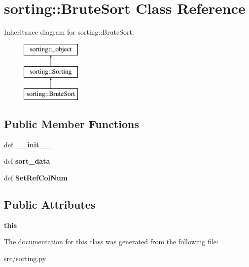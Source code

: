 \hypertarget{classsorting_1_1BruteSort}{
\section{sorting::BruteSort Class Reference}
\label{d3/dc2/classsorting_1_1BruteSort}
}
Inheritance diagram for sorting::BruteSort:\begin{figure}[H]
\begin{center}
\leavevmode
\includegraphics[height=3cm]{d3/dc2/classsorting_1_1BruteSort}
\end{center}
\end{figure}
\subsection*{Public Member Functions}
\begin{DoxyCompactItemize}
\item 
\hypertarget{classsorting_1_1BruteSort_ab23764289597790c5cdef1524bba8beb}{
def {\bfseries \_\-\_\-init\_\-\_\-}}
\label{d3/dc2/classsorting_1_1BruteSort_ab23764289597790c5cdef1524bba8beb}

\item 
\hypertarget{classsorting_1_1BruteSort_a02742dba963ab95c7f1f0106107b7234}{
def {\bfseries sort\_\-data}}
\label{d3/dc2/classsorting_1_1BruteSort_a02742dba963ab95c7f1f0106107b7234}

\item 
\hypertarget{classsorting_1_1BruteSort_a601fe10f0942c6fd6707eda68b7ec40a}{
def {\bfseries SetRefColNum}}
\label{d3/dc2/classsorting_1_1BruteSort_a601fe10f0942c6fd6707eda68b7ec40a}

\end{DoxyCompactItemize}
\subsection*{Public Attributes}
\begin{DoxyCompactItemize}
\item 
\hypertarget{classsorting_1_1BruteSort_abaf959081e7032ed48fe657be3d1c034}{
{\bfseries this}}
\label{d3/dc2/classsorting_1_1BruteSort_abaf959081e7032ed48fe657be3d1c034}

\end{DoxyCompactItemize}


The documentation for this class was generated from the following file:\begin{DoxyCompactItemize}
\item 
src/sorting.py\end{DoxyCompactItemize}
